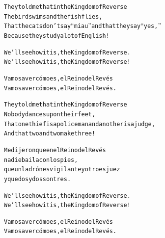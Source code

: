 \documentclass[11pt,a4paper]{article}
\begin{document}
\begin{parcolumns}[distance=8em,nofirstindent=true]{2}

\colchunk
{
\begin{alltt}\normalfont
They told me that in the Kingdom of Reverse
The bird swims and the fish flies,
That the cats don’t say “miau” and that they say “yes,”
Because they study a lot of English!
\end{alltt}
}


\colplacechunks

\colchunk
{
\begin{alltt}\normalfont
We’ll see how it is, the Kingdom of Reverse.
We’ll see how it is, the Kingdom of Reverse!
\end{alltt}
}

\colchunk
{
\begin{alltt}\normalfont
  Vamos a ver cómo es, el Reino del Revés\\
  Vamos a ver cómo es, el Reino del Revés.
\end{alltt}
}

\colplacechunks

\colchunk
{
\begin{alltt}\normalfont
They told me that in the Kingdom of Reverse
Nobody dances upon their feet,
That one thief is a policeman and another is a judge,
And that two and two make three!
\end{alltt}
}

\colchunk
{
\begin{alltt}\normalfont
Me dijeron que en el Reino del Revés
nadie baila con los pies,
que un ladrón es vigilante y otro es juez
y que dos y dos son tres.
\end{alltt}
}

\colplacechunks

\colchunk
{
\begin{alltt}\normalfont
We’ll see how it is, the Kingdom of Reverse.
We’ll see how it is, the Kingdom of Reverse!
\end{alltt}
}

\colchunk
{
\begin{alltt}\normalfont
Vamos a ver cómo es, el Reino del Revés
Vamos a ver cómo es, el Reino del Revés.
\end{alltt}
}


\end{parcolumns}
\end{document}

